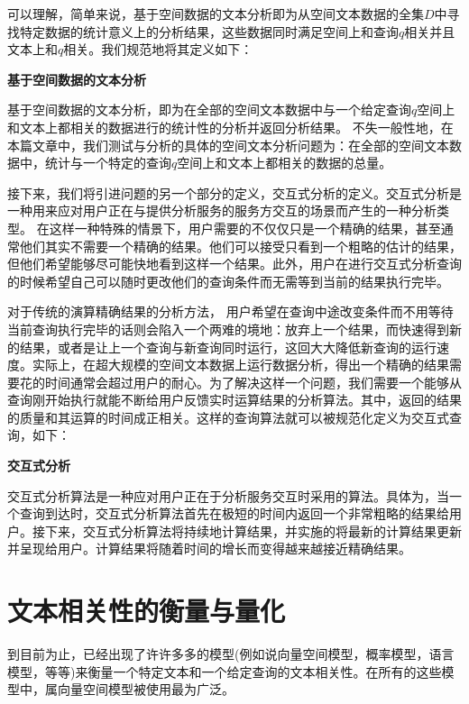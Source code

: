 可以理解，简单来说，基于空间数据的文本分析即为从空间文本数据的全集$D$中寻找特定数据的统计意义上的分析结果，这些数据同时满足空间上和查询$q$相关并且文本上和$q$相关。我们规范地将其定义如下：

\begin{definition}
	{\bf 基于空间数据的文本分析}
	
	基于空间数据的文本分析，即为在全部的空间文本数据中与一个给定查询$q$空间上和文本上都相关的数据进行的统计性的分析并返回分析结果。 不失一般性地，在本篇文章中，我们测试与分析的具体的空间文本分析问题为：在全部的空间文本数据中，统计与一个特定的查询$q$空间上和文本上都相关的数据的总量。
\end{definition}


接下来，我们将引进问题的另一个部分的定义，交互式分析的定义。交互式分析是一种用来应对用户正在与提供分析服务的服务方交互的场景而产生的一种分析类型。 在这样一种特殊的情景下，用户需要的不仅仅只是一个精确的结果，甚至通常他们其实不需要一个精确的结果。他们可以接受只看到一个粗略的估计的结果，但他们希望能够尽可能快地看到这样一个结果。此外，用户在进行交互式分析查询的时候希望自己可以随时更改他们的查询条件而无需等到当前的结果执行完毕。

对于传统的演算精确结果的分析方法， 用户希望在查询中途改变条件而不用等待当前查询执行完毕的话则会陷入一个两难的境地：放弃上一个结果，而快速得到新的结果，或者是让上一个查询与新查询同时运行，这回大大降低新查询的运行速度。实际上，在超大规模的空间文本数据上运行数据分析，得出一个精确的结果需要花的时间通常会超过用户的耐心。为了解决这样一个问题，我们需要一个能够从查询刚开始执行就能不断给用户反馈实时运算结果的分析算法。其中，返回的结果的质量和其运算的时间成正相关。这样的查询算法就可以被规范化定义为交互式查询，如下：

\begin{definition}
	{\bf 交互式分析}
	
交互式分析算法是一种应对用户正在于分析服务交互时采用的算法。具体为，当一个查询到达时，交互式分析算法首先在极短的时间内返回一个非常粗略的结果给用户。接下来，交互式分析算法将持续地计算结果，并实施的将最新的计算结果更新并呈现给用户。计算结果将随着时间的增长而变得越来越接近精确结果。

\end{definition}


\section{文本相关性的衡量与量化}
\label{sec:other}
到目前为止，已经出现了许许多多的模型(例如说向量空间模型，概率模型，语言模型，等等)来衡量一个特定文本和一个给定查询的文本相关性。在所有的这些模型中，属向量空间模型被使用最为广泛。

